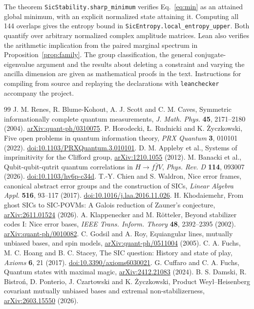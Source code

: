 \documentclass[11pt]{article}
\begin{document}
The theorem \texttt{SicStability.sharp\_minimum} verifies Eq.~\eqref{eq:min} as an attained global minimum, with an explicit normalized state attaining it. Computing all 144 overlaps gives the entropy bound in \texttt{SicEntropy.}\allowbreak\texttt{local\_entropy\_upper}. Both quantify over arbitrary normalized complex amplitude matrices. Lean also verifies the arithmetic implication from the paired marginal spectrum in Proposition~\ref{prop:family}. The group classification, the general conjugate-eigenvalue argument and the results about deleting a constraint and varying the ancilla dimension are given as mathematical proofs in the text. Instructions for compiling from source and replaying the declarations with \texttt{leanchecker} accompany the project.

\begingroup\small
\begin{thebibliography}{99}
\setlength{\itemsep}{3pt}
 J. M. Renes, R. Blume-Kohout, A. J. Scott and C. M. Caves, Symmetric informationally complete quantum measurements, \emph{J. Math. Phys.} \textbf{45}, 2171--2180 (2004). \href{https://arxiv.org/abs/quant-ph/0310075}{arXiv:quant-ph/0310075}.
 P. Horodecki, \L. Rudnicki and K. \.Zyczkowski, Five open problems in quantum information theory, \emph{PRX Quantum} \textbf{3}, 010101 (2022). \href{https://doi.org/10.1103/PRXQuantum.3.010101}{doi:10.1103/PRXQuantum.3.010101}.
 D. M. Appleby et al., Systems of imprimitivity for the Clifford group, \href{https://arxiv.org/abs/1210.1055}{arXiv:1210.1055} (2012).
 M. Banacki et al., Qubit-qubit-qutrit quantum correlations in $H\to f\bar f V$, \emph{Phys. Rev. D} \textbf{114}, 093007 (2026). \href{https://doi.org/10.1103/hv6p-c34d}{doi:10.1103/hv6p-c34d}.
 T.-Y. Chien and S. Waldron, Nice error frames, canonical abstract error groups and the construction of SICs, \emph{Linear Algebra Appl.} \textbf{516}, 93--117 (2017). \href{https://doi.org/10.1016/j.laa.2016.11.026}{doi:10.1016/j.laa.2016.11.026}.
 H. Khodaiemehr, From ghost SICs to SIC-POVMs: A Galois reduction of Zauner's conjecture, \href{https://arxiv.org/abs/2611.01524}{arXiv:2611.01524} (2026).
 A. Klappenecker and M. R\"otteler, Beyond stabilizer codes I: Nice error bases, \emph{IEEE Trans. Inform. Theory} \textbf{48}, 2392--2395 (2002). \href{https://arxiv.org/abs/quant-ph/0010082}{arXiv:quant-ph/0010082}.
 C. Godsil and A. Roy, Equiangular lines, mutually unbiased bases, and spin models, \href{https://arxiv.org/abs/quant-ph/0511004}{arXiv:quant-ph/0511004} (2005).
 C. A. Fuchs, M. C. Hoang and B. C. Stacey, The SIC question: History and state of play, \emph{Axioms} \textbf{6}, 21 (2017). \href{https://doi.org/10.3390/axioms6030021}{doi:10.3390/axioms6030021}.
 G. Cuffaro and C. A. Fuchs, Quantum states with maximal magic, \href{https://arxiv.org/abs/2412.21083}{arXiv:2412.21083} (2024).
 B. S. Damski, R. Bistro\'n, D. Ponterio, J. Czartowski and K. \.Zyczkowski, Product Weyl--Heisenberg covariant mutually unbiased bases and extremal non-stabilizerness, \href{https://arxiv.org/abs/2603.15550}{arXiv:2603.15550} (2026).
\end{thebibliography}
\endgroup
\end{document}
